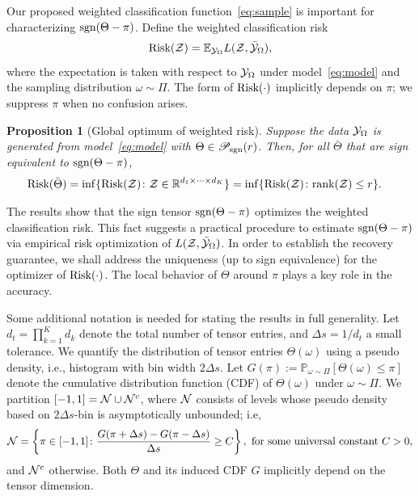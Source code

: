 \documentclass{article}
\theoremstyle{plain}
\newtheorem{prop}{Proposition}
\theoremstyle{definition}
\def\sign{\textup{sgn}}
\def\caliP{\mathscr{P}_{\textup{sgn}}}
\def\risk{\textup{Risk}}
\begin{document}
Our proposed weighted classification function~\eqref{eq:sample} is important for characterizing $\sign(\Theta-\pi)$. Define the weighted classification risk 
\begin{equation}\label{eq:population}
\textup{Risk}(\mathcal{Z})=\mathbb{E}_{\mathcal{Y}_\Omega}L(\mathcal{Z},\bar{\mathcal{Y}}_\Omega),
\end{equation}
where the expectation is taken with respect to $\mathcal{Y}_\Omega$ under model~\eqref{eq:model} and the sampling distribution $\omega\sim\Pi$. %
The form of $\textup{Risk}(\cdot)$ implicitly depends on $\pi$; we suppress $\pi$ when no confusion arises. 

\vspace{.05cm}
\begin{prop}[Global optimum of weighted risk]\label{prop:global}
Suppose the data $\mathcal{Y}_\Omega$ is generated from model~\eqref{eq:model} with $\Theta \in \caliP(r)$. Then, for all $\bar \Theta$ that are sign equivalent to $\sign(\Theta-\pi)$, 
\begin{align}\label{eq:optimal}
\textup{Risk}(\bar \Theta )&=\inf\{\textup{Risk}(\mathcal{Z})\colon \mathcal{Z}\in\mathbb{R}^{d_1\times \cdots \times d_K}\}
=\inf\{\textup{Risk}(\mathcal{Z})\colon \textup{rank} (\mathcal{Z})\leq r\}.
\end{align}
\end{prop}
The results show that the sign tensor $\sign(\Theta-\pi)$ optimizes the weighted classification risk. This fact suggests a practical procedure to estimate $\sign(\Theta-\pi)$ via empirical risk optimization of $L(\mathcal{Z},\bar {\mathcal{Y}}_\Omega)$. In order to establish the recovery guarantee, we shall address the uniqueness (up to sign equivalence) for the optimizer of $\risk(\cdot)$. The local behavior of $\Theta$ around $\pi$ plays a key role in the accuracy. 

Some additional notation is needed for stating the results in full generality. Let $d_t=\prod^K_{k=1} d_k$ denote the total number of tensor entries, and $\Delta s = 1/d_t$ a small tolerance. We quantify the distribution of tensor entries $\Theta(\omega)$ using a pseudo density, i.e., histogram with bin width $2\Delta s$. Let $G(\pi):=\mathbb{P}_{\omega\sim \Pi}[\Theta(\omega)\leq \pi]$ denote the cumulative distribution function (CDF) of $\Theta(\omega)$ under $\omega\sim \Pi$. We partition $[-1,1]=\mathcal{N} \cup \mathcal{N}^c$, where $\mathcal{N}$ consists of levels whose pseudo density based on $2\Delta s$-bin is asymptotically unbounded; i.e,
\[
\mathcal{N}=\left\{\pi\in[-1,1] \colon {G(\pi+{\Delta s})-G(\pi-{\Delta s})\over \Delta s} \geq C \right\},\ \text{for some universal constant }C>0,
\]
and $\mathcal{N}^c$ otherwise. 
Both $\Theta$ and its induced CDF $G$ implicitly depend on the tensor dimension. 
\end{document}
